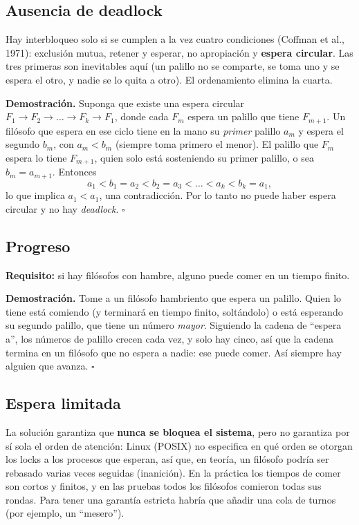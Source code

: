 \documentclass[12pt,letterpaper]{article}
\begin{document}
\subsection{Ausencia de deadlock}
Hay interbloqueo solo si se cumplen a la vez cuatro condiciones (Coffman et al., 1971): exclusión mutua, retener y esperar, no apropiación y \textbf{espera circular}. Las tres primeras son inevitables aquí (un palillo no se comparte, se toma uno y se espera el otro, y nadie se lo quita a otro). El ordenamiento elimina la cuarta.

\textbf{Demostración.} Suponga que existe una espera circular $F_1 \to F_2 \to \dots \to F_k \to F_1$, donde cada $F_m$ espera un palillo que tiene $F_{m+1}$. Un filósofo que espera en ese ciclo tiene en la mano su \emph{primer} palillo $a_m$ y espera el segundo $b_m$, con $a_m < b_m$ (siempre toma primero el menor). El palillo que $F_m$ espera lo tiene $F_{m+1}$, quien solo está sosteniendo su primer palillo, o sea $b_m = a_{m+1}$. Entonces
\[
a_1 < b_1 = a_2 < b_2 = a_3 < \dots < a_k < b_k = a_1 ,
\]
lo que implica $a_1 < a_1$, una contradicción. Por lo tanto no puede haber espera circular y no hay \emph{deadlock}. \hfill$\square$

\subsection{Progreso}
\textbf{Requisito:} si hay filósofos con hambre, alguno puede comer en un tiempo finito.

\textbf{Demostración.} Tome a un filósofo hambriento que espera un palillo. Quien lo tiene está comiendo (y terminará en tiempo finito, soltándolo) o está esperando su segundo palillo, que tiene un número \emph{mayor}. Siguiendo la cadena de ``espera a'', los números de palillo crecen cada vez, y solo hay cinco, así que la cadena termina en un filósofo que no espera a nadie: ese puede comer. Así siempre hay alguien que avanza. \hfill$\square$

\subsection{Espera limitada}
La solución garantiza que \textbf{nunca se bloquea el sistema}, pero no garantiza por sí sola el orden de atención: Linux (POSIX) no especifica en qué orden se otorgan los locks a los procesos que esperan, así que, en teoría, un filósofo podría ser rebasado varias veces seguidas (inanición). En la práctica los tiempos de comer son cortos y finitos, y en las pruebas todos los filósofos comieron todas sus rondas. Para tener una garantía estricta habría que añadir una cola de turnos (por ejemplo, un ``mesero'').
\end{document}
